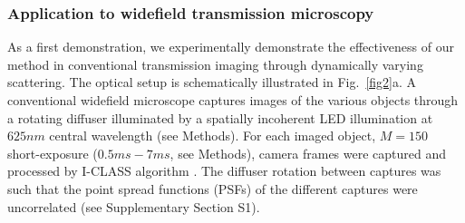 \documentclass[pdflatex,sn-mathphys-num]{sn-jnl}%
\theoremstyle{thmstyleone}%
\theoremstyle{thmstyletwo}%
\theoremstyle{thmstylethree}%
\begin{document}
\subsubsection*{Application to widefield transmission microscopy}

As a first demonstration, we experimentally demonstrate the effectiveness of our method in conventional transmission imaging through dynamically varying scattering. %
The optical setup is schematically illustrated in Fig.~\ref{fig2}a. A conventional widefield microscope captures images of the various objects through a rotating diffuser illuminated by a spatially incoherent LED illumination at $625nm$ central wavelength (see Methods). %
For each imaged object, $M=150$ short-exposure ($0.5ms-7ms$, see Methods), camera frames were captured and processed by I-CLASS algorithm \cite{weinberg2023noninvasive}. The diffuser rotation between captures was such that the point spread functions (PSFs) of the different captures were uncorrelated (see Supplementary Section S1).

\end{document}
